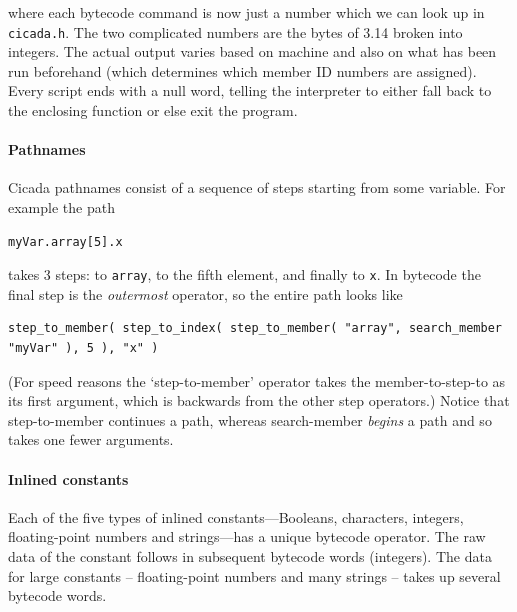 \documentclass{article}
\newenvironment{code}{
       \begin{list}{}{
               \setlength{\leftmargin}{.4in}
               \setlength{\rightmargin}{0in}
               \setlength{\topsep}{.2in}
       }
       \small
       \item[] }
       { \end{list}   }
\begin{document}
\noindent where each bytecode command is now just a number which we can look up in \verb#cicada.h#.  The two complicated numbers are the bytes of 3.14 broken into integers.  The actual output varies based on machine and also on what has been run beforehand (which determines which member ID numbers are assigned).   Every script ends with a null word, telling the interpreter to either fall back to the enclosing function or else exit the program.



\paragraph{Pathnames} 

Cicada pathnames consist of a sequence of steps starting from some variable.  For example the path 

\begin{code} \begin{verbatim}
myVar.array[5].x
\end{verbatim} \end{code}

\noindent takes 3 steps:  to \verb#array#, to the fifth element, and finally to \verb#x#.  In bytecode the final step is the \emph{outermost} operator, so the entire path looks like

\begin{code} \begin{verbatim}
step_to_member( step_to_index( step_to_member( "array", search_member "myVar" ), 5 ), "x" )
\end{verbatim} \end{code}

\noindent (For speed reasons the `step-to-member' operator takes the member-to-step-to as its first argument, which is backwards from the other step operators.)  Notice that step-to-member continues a path, whereas search-member \emph{begins} a path and so takes one fewer arguments.




\paragraph{Inlined constants}

Each of the five types of inlined constants---Booleans, characters, integers, floating-point numbers and strings---has a unique bytecode operator.  The raw data of the constant follows in subsequent bytecode words (integers).  The data for large constants -- floating-point numbers and many strings -- takes up several bytecode words.
\end{document}

